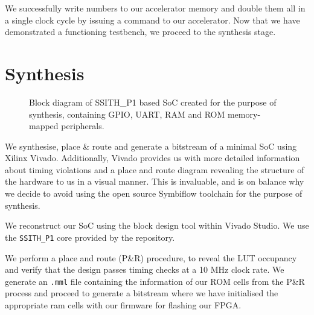 \documentclass[a4paper,8pt]{report}
\begin{document}
We successfully write numbers to our accelerator memory and double them all in a
single clock cycle by issuing a command to our accelerator. Now that we have
demonstrated a functioning testbench, we proceed to the synthesis stage. 

\section{Synthesis}
\begin{figure}[b]
  \centering
  \caption{Block diagram of SSITH\_P1 based SoC created for the purpose of
    synthesis, containing GPIO, UART, RAM and ROM memory-mapped peripherals.}
\end{figure}

We synthesise, place \& route and generate a bitstream of a minimal SoC using
Xilinx Vivado. Additionally, Vivado provides us with more detailed information
about timing violations and a place and route diagram revealing the structure of
the hardware to us in a visual manner. This is invaluable, and is on balance why
we decide to avoid using the open source Symbiflow toolchain for the purpose of
synthesis.

We reconstruct our SoC using the block design tool within Vivado Studio. We use
the \texttt{SSITH\_P1} core provided by the repository.

We perform a place and route (P\&R) procedure, to reveal the LUT occupancy and verify
that the design passes timing checks at a 10 MHz clock rate. We generate an \texttt{.mml}
file containing the information of our ROM cells from the P\&R process and
proceed to generate a bitstream where we have initialised the appropriate ram
cells with our firmware for flashing our FPGA.
\end{document}
